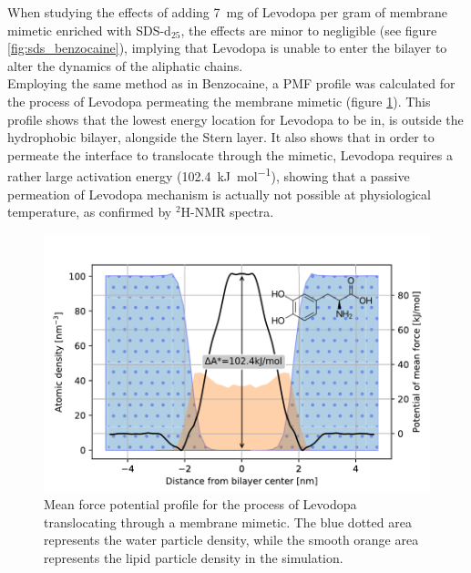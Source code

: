 \documentclass[3p,preprint,review]{elsarticle}
\begin{document}
	When studying the
	effects of adding \SI{7}{mg} of Levodopa per gram of membrane mimetic enriched
	with SDS-d$_{25}$, the effects are minor to negligible (see figure
	\ref{fig:sds_benzocaine}),
	implying that Levodopa is unable to enter the bilayer to alter
	the dynamics of the aliphatic chains.\\
	Employing the same method as in Benzocaine, a PMF profile was calculated for
	the
	process of Levodopa permeating the membrane mimetic (figure
	\ref{fig:levodopa_profile}). This profile shows that the lowest
	energy location for Levodopa to be in, is outside the hydrophobic bilayer, alongside the
	Stern
	layer.
	It also shows that in order to permeate the interface to translocate through
	the mimetic, Levodopa requires a rather
	large activation energy (\SI{102.4}{\kilo\joule\per\mol}), showing that a
	passive permeation of Levodopa mechanism is actually not possible at
	physiological temperature, as confirmed by $^2$H-NMR spectra. 
	\begin{figure}[htb]
		\centering
		\includegraphics[width=\columnwidth]{ldopa_profile_density}    
		\caption{Mean force potential profile for the process of Levodopa
			translocating through a membrane mimetic. The blue dotted area represents
			the water particle density, while the smooth orange area represents the
			lipid particle density in the simulation.}
		\label{fig:levodopa_profile}
	\end{figure}
	
	
	
\end{document}
